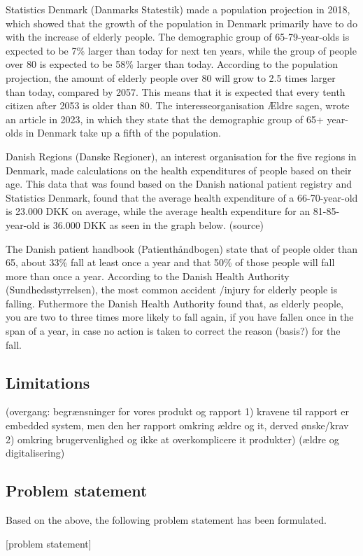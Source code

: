 Statistics Denmark (Danmarks Statestik) made a population projection in 2018, which showed that the growth of the population in Denmark primarily have to do with the increase of elderly people. The demographic group of 65-79-year-olds is expected to be 7\% larger than today for next ten years, while the group of people over 80 is expected to be 58\% larger than today. According to the population projection, the amount of elderly people over 80 will grow to 2.5 times larger than today, compared by 2057. This means that it is expected that every tenth citizen after 2053 is older than 80\cite{noauthor_nyt_nodate}. The interesseorganisation Ældre sagen, wrote an article in 2023, in which they state that the demographic group of 65+ year-olds in Denmark take up a fifth of the population\cite{noauthor_aeldre_nodate}.

Danish Regions (Danske Regioner), an interest organisation for the five regions in Denmark, made calculations on the health expenditures of people based on their age. This data that was found based on the Danish national patient registry and Statistics Denmark, found that the average health expenditure of a 66-70-year-old is 23.000 DKK on average, while the average health expenditure for an 81-85-year-old is 36.000 DKK as seen in the graph below. (source) 

 The Danish patient handbook (Patienthåndbogen) state that of people older than 65, about 33\% fall at least once a year and that 50\% of those people will fall more than once a year. According to the Danish Health Authority (Sundhedsstyrrelsen), the most common accident /injury for elderly people is falling. Futhermore the Danish Health Authority found that, as elderly people, you are two to three times more likely to fall again, if you have fallen once in the span of a year, in case no action is taken to correct the reason (basis?) for the fall. 

\subsection{Limitations}
(overgang: begrænsninger for vores produkt og rapport 1) kravene til rapport er embedded system, men den her rapport omkring ældre og it, derved ønske/krav 2) omkring brugervenlighed og ikke at overkomplicere it produkter)
 (ældre og digitalisering)

\subsection{Problem statement}
Based on the above, the following problem statement has been formulated. 

[problem statement] 

 